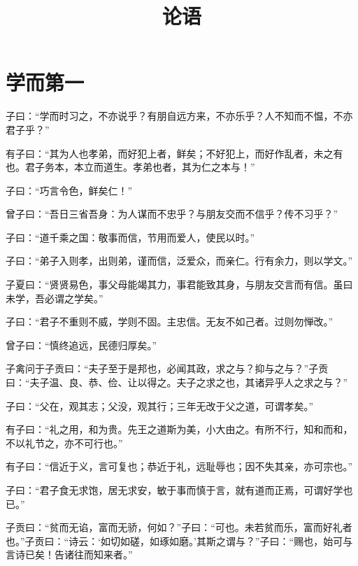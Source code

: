\documentclass[twoside,openany]{book}
\title{论语}
\author{ }
\date{}
\begin{document}
\maketitle
\tableofcontents
	
\noindent
	
	
\chapter{学而第一}\label{ch1}

子曰：“学而时习之，不亦说乎？有朋自远方来，不亦乐乎？人不知而不愠，不亦君子乎？”

有子曰：“其为人也孝弟，而好犯上者，鲜矣；不好犯上，而好作乱者，未之有也。君子务本，本立而道生。孝弟也者，其为仁之本与！”

子曰：“巧言令色，鲜矣仁！”

曾子曰：“吾日三省吾身：为人谋而不忠乎？与朋友交而不信乎？传不习乎？”

子曰：“道千乘之国：敬事而信，节用而爱人，使民以时。”

子曰：“弟子入则孝，出则弟，谨而信，泛爱众，而亲仁。行有余力，则以学文。”

子夏曰：“贤贤易色，事父母能竭其力，事君能致其身，与朋友交言而有信。虽曰未学，吾必谓之学矣。”

子曰：“君子不重则不威，学则不固。主忠信。无友不如己者。过则勿惮改。”

曾子曰：“慎终追远，民德归厚矣。”

子禽问于子贡曰：“夫子至于是邦也，必闻其政，求之与？抑与之与？”子贡曰：“夫子温、良、恭、俭、让以得之。夫子之求之也，其诸异乎人之求之与？”

子曰：“父在，观其志；父没，观其行；三年无改于父之道，可谓孝矣。”

有子曰：“礼之用，和为贵。先王之道斯为美，小大由之。有所不行，知和而和，不以礼节之，亦不可行也。”

有子曰：“信近于义，言可复也；恭近于礼，远耻辱也；因不失其亲，亦可宗也。”

子曰：“君子食无求饱，居无求安，敏于事而慎于言，就有道而正焉，可谓好学也已。”

子贡曰：“贫而无谄，富而无骄，何如？”子曰：“可也。未若贫而乐，富而好礼者也。”子贡曰：“诗云：‘如切如磋，如琢如磨。’其斯之谓与？”子曰：“赐也，始可与言诗已矣！告诸往而知来者。”
\end{document}
